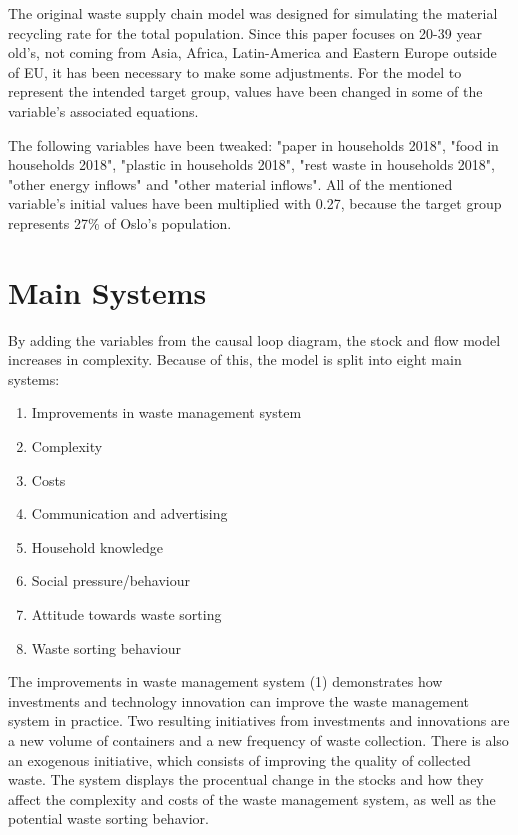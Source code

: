 \indent \newline
The original waste supply chain model was designed for simulating the material recycling rate for the total population. Since this paper focuses on 20-39 year old's, not coming from Asia, Africa, Latin-America and Eastern Europe outside of EU, it has been necessary to make some adjustments. For the model to represent the intended target group, values have been changed in some of the variable’s associated equations.

\indent \newline
The following variables have been tweaked: "paper in households 2018", "food in households 2018", "plastic in households 2018", "rest waste in households 2018", "other energy inflows" and "other material inflows". All of the mentioned variable's initial values have been multiplied with 0.27, because the target group represents 27\% of Oslo's population. 

\section{Main Systems}

\indent \newline
By adding the variables from the causal loop diagram, the stock and
flow model increases in complexity. Because of this, the model is split 
into eight main systems: 

\indent \newline
\begin{enumerate}
\item Improvements in waste management system
\item Complexity
\item Costs 
\item Communication and advertising 
\item Household knowledge
\item Social pressure/behaviour
\item Attitude towards waste sorting
\item Waste sorting behaviour
\end{enumerate} 

\indent \newline
The improvements in waste management system (1) demonstrates how investments and technology innovation can improve the waste management system in practice. Two resulting initiatives from investments and innovations are a new volume of containers and a new frequency of waste collection. There is also an exogenous initiative, which consists of improving the quality of collected waste. The system displays the procentual change in the stocks and how they affect the complexity and costs of the waste management system, as well as the potential waste sorting behavior. 

